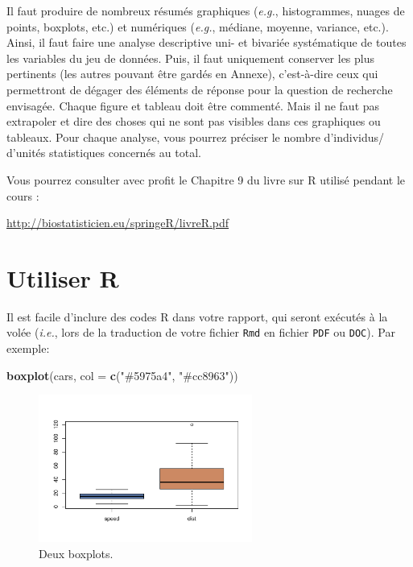 \documentclass[mstat,12pt]{unswthesis}
\newenvironment{Shaded}{\begin{snugshade}}{\end{snugshade}}
\newcommand{\AttributeTok}[1]{\textcolor[rgb]{0.13,0.29,0.53}{#1}}
\newcommand{\FunctionTok}[1]{\textcolor[rgb]{0.13,0.29,0.53}{\textbf{#1}}}
\newcommand{\NormalTok}[1]{#1}
\newcommand{\StringTok}[1]{\textcolor[rgb]{0.31,0.60,0.02}{#1}}
\begin{document}
Il faut produire de nombreux résumés graphiques (\emph{e.g.},
histogrammes, nuages de points, boxplots, etc.) et numériques
(\emph{e.g.}, médiane, moyenne, variance, etc.). Ainsi, il faut faire
une analyse descriptive uni- et bivariée systématique de toutes les
variables du jeu de données. Puis, il faut uniquement conserver les plus
pertinents (les autres pouvant être gardés en Annexe), c'est-à-dire ceux
qui permettront de dégager des éléments de réponse pour la question de
recherche envisagée. Chaque figure et tableau doit être commenté. Mais
il ne faut pas extrapoler et dire des choses qui ne sont pas visibles
dans ces graphiques ou tableaux. Pour chaque analyse, vous pourrez
préciser le nombre d'individus/ d'unités statistiques concernés au
total.

Vous pourrez consulter avec profit le Chapitre 9 du livre sur R utilisé
pendant le cours :

\url{http://biostatisticien.eu/springeR/livreR.pdf}

\section{Utiliser R}\label{utiliser-r}

Il est facile d'inclure des codes R dans votre rapport, qui seront
exécutés à la volée (\emph{i.e.}, lors de la traduction de votre fichier
\texttt{Rmd} en fichier \texttt{PDF} ou \texttt{DOC}). Par exemple:

\begin{Shaded}
\begin{Highlighting}[]
\FunctionTok{boxplot}\NormalTok{(cars, }\AttributeTok{col =} \FunctionTok{c}\NormalTok{(}\StringTok{"\#5975a4"}\NormalTok{, }\StringTok{"\#cc8963"}\NormalTok{))}
\end{Highlighting}
\end{Shaded}

\begin{figure}

{\centering \includegraphics[width=7cm]{scdon2-UPV-report-template_sansPython_files/figure-latex/unnamed-chunk-1-1} 

}

\caption{\label{fig:boxplots}Deux boxplots.}\label{fig:unnamed-chunk-1}
\end{figure}
\end{document}
